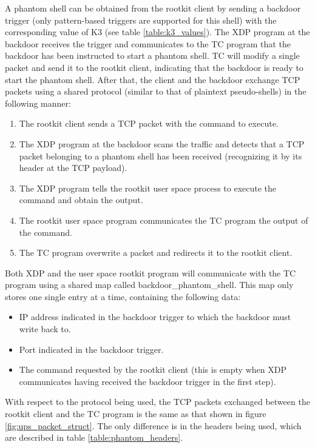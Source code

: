 A phantom shell can be obtained from the rootkit client by sending a backdoor trigger (only pattern-based triggers are supported for this shell) with the corresponding value of K3 (see table \ref{table:k3_values}). The XDP program at the backdoor receives the trigger and communicates to the TC program that the backdoor has been instructed to start a phantom shell. TC will modify a single packet and send it to the rootkit client, indicating that the backdoor is ready to start the phantom shell. After that, the client and the backdoor exchange TCP packets using a shared protocol (similar to that of plaintext pseudo-shells) in the following manner:
\begin{enumerate}
\item The rootkit client sends a TCP packet with the command to execute.
\item The XDP program at the backdoor scans the traffic and detects that a TCP packet belonging to a phantom shell has been received (recognizing it by its header at the TCP payload).
\item The XDP program tells the rootkit user space process to execute the command and obtain the output.
\item The rootkit user space program communicates the TC program the output of the command.
\item The TC program overwrite a packet and redirects it to the rootkit client.
\end{enumerate}

Both XDP and the user space rootkit program will communicate with the TC program using a shared map called backdoor\_phantom\_shell. This map only stores one single entry at a time, containing the following data:
\begin{itemize}
\item IP address indicated in the backdoor trigger to which the backdoor must write back to.
\item Port indicated in the backdoor trigger.
\item The command requested by the rootkit client (this is empty when XDP communicates having received the backdoor trigger in the first step).
\end{itemize}

With respect to the protocol being used, the TCP packets exchanged between the rootkit client and the TC program is the same as that shown in figure \ref{fig:ups_packet_struct}. The only difference is in the headers being used, which are described in table \ref{table:phantom_headers}.

